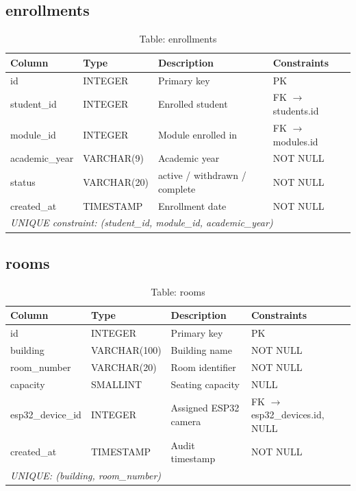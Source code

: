 \documentclass[12pt,a4paper]{report}
\begin{document}
\subsection{enrollments}
\begin{table}[H]
\centering\small
\caption{Table: enrollments}
\begin{tabularx}{\linewidth}{llXl}
\toprule
\textbf{Column} & \textbf{Type} & \textbf{Description} & \textbf{Constraints} \\
\midrule
id            & INTEGER   & Primary key                  & PK \\
student\_id   & INTEGER   & Enrolled student             & FK $\to$ students.id \\
module\_id    & INTEGER   & Module enrolled in           & FK $\to$ modules.id \\
academic\_year& VARCHAR(9)& Academic year                & NOT NULL \\
status        & VARCHAR(20)& active / withdrawn / complete& NOT NULL \\
created\_at   & TIMESTAMP & Enrollment date              & NOT NULL \\
\midrule
\multicolumn{4}{l}{\textit{UNIQUE constraint: (student\_id, module\_id, academic\_year)}} \\
\bottomrule
\end{tabularx}
\end{table}

\subsection{rooms}
\begin{table}[H]
\centering\small
\caption{Table: rooms}
\begin{tabularx}{\linewidth}{llXl}
\toprule
\textbf{Column} & \textbf{Type} & \textbf{Description} & \textbf{Constraints} \\
\midrule
id               & INTEGER      & Primary key               & PK \\
building         & VARCHAR(100) & Building name             & NOT NULL \\
room\_number     & VARCHAR(20)  & Room identifier           & NOT NULL \\
capacity         & SMALLINT     & Seating capacity          & NULL \\
esp32\_device\_id& INTEGER      & Assigned ESP32 camera     & FK $\to$ esp32\_devices.id, NULL \\
created\_at      & TIMESTAMP    & Audit timestamp           & NOT NULL \\
\midrule
\multicolumn{4}{l}{\textit{UNIQUE: (building, room\_number)}} \\
\bottomrule
\end{tabularx}
\end{table}
\end{document}
